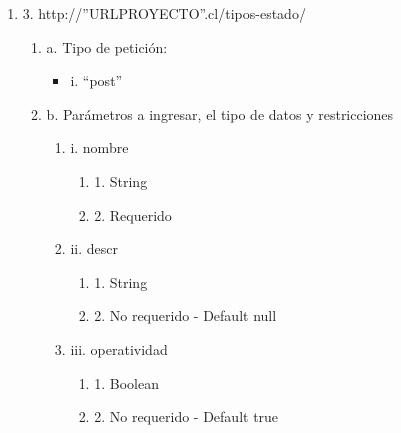 \begin{enumerate}
    \item 3. http://”URLPROYECTO”.cl/tipos-estado/
    \begin{enumerate}
        \item a. Tipo de petición:
            \begin{itemize}
               \item i. “post”
            \end{itemize}
        \item b. Parámetros a ingresar, el tipo de datos y restricciones
            \begin{enumerate}
                \item i. nombre
                    \begin{enumerate}
                        \item 1. String
                        \item 2. Requerido
                    \end{enumerate}
                \item ii. descr
                    \begin{enumerate}
                        \item 1. String
                        \item 2. No requerido - Default null
                    \end{enumerate}
                \item iii. operatividad
                    \begin{enumerate}
                        \item 1. Boolean
                        \item 2. No requerido - Default true
                    \end{enumerate}
            \end{enumerate}
    \end{enumerate}


\end{enumerate}
